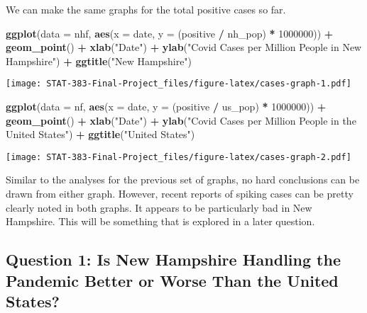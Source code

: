 \documentclass[
]{article}
\newenvironment{Shaded}{\begin{snugshade}}{\end{snugshade}}
\newcommand{\DataTypeTok}[1]{\textcolor[rgb]{0.13,0.29,0.53}{#1}}
\newcommand{\DecValTok}[1]{\textcolor[rgb]{0.00,0.00,0.81}{#1}}
\newcommand{\KeywordTok}[1]{\textcolor[rgb]{0.13,0.29,0.53}{\textbf{#1}}}
\newcommand{\NormalTok}[1]{#1}
\newcommand{\OperatorTok}[1]{\textcolor[rgb]{0.81,0.36,0.00}{\textbf{#1}}}
\newcommand{\StringTok}[1]{\textcolor[rgb]{0.31,0.60,0.02}{#1}}
\begin{document}
We can make the same graphs for the total positive cases so far.

\begin{Shaded}
\begin{Highlighting}[]
\KeywordTok{ggplot}\NormalTok{(}\DataTypeTok{data =}\NormalTok{ nhf, }\KeywordTok{aes}\NormalTok{(}\DataTypeTok{x =}\NormalTok{ date, }\DataTypeTok{y =}\NormalTok{ (positive }\OperatorTok{/}\StringTok{ }\NormalTok{nh_pop) }\OperatorTok{*}\StringTok{ }\DecValTok{1000000}\NormalTok{)) }\OperatorTok{+}\StringTok{ }\KeywordTok{geom_point}\NormalTok{() }\OperatorTok{+}\StringTok{ }\KeywordTok{xlab}\NormalTok{(}\StringTok{"Date"}\NormalTok{) }\OperatorTok{+}\StringTok{ }\KeywordTok{ylab}\NormalTok{(}\StringTok{"Covid Cases per Million People in New Hampshire"}\NormalTok{) }\OperatorTok{+}\StringTok{ }\KeywordTok{ggtitle}\NormalTok{(}\StringTok{"New Hampshire"}\NormalTok{)}
\end{Highlighting}
\end{Shaded}

\texttt{[image: STAT-383-Final-Project\_files/figure-latex/cases-graph-1.pdf]}

\begin{Shaded}
\begin{Highlighting}[]
\KeywordTok{ggplot}\NormalTok{(}\DataTypeTok{data =}\NormalTok{ nf, }\KeywordTok{aes}\NormalTok{(}\DataTypeTok{x =}\NormalTok{ date, }\DataTypeTok{y =}\NormalTok{ (positive }\OperatorTok{/}\StringTok{ }\NormalTok{us_pop) }\OperatorTok{*}\StringTok{ }\DecValTok{1000000}\NormalTok{)) }\OperatorTok{+}\StringTok{ }\KeywordTok{geom_point}\NormalTok{() }\OperatorTok{+}\StringTok{ }\KeywordTok{xlab}\NormalTok{(}\StringTok{"Date"}\NormalTok{) }\OperatorTok{+}\StringTok{ }\KeywordTok{ylab}\NormalTok{(}\StringTok{"Covid Cases per Million People in the United States"}\NormalTok{) }\OperatorTok{+}\StringTok{ }\KeywordTok{ggtitle}\NormalTok{(}\StringTok{"United States"}\NormalTok{)}
\end{Highlighting}
\end{Shaded}

\texttt{[image: STAT-383-Final-Project\_files/figure-latex/cases-graph-2.pdf]}

Similar to the analyses for the previous set of graphs, no hard
conclusions can be drawn from either graph. However, recent reports of
spiking cases can be pretty clearly noted in both graphs. It appears to
be particularly bad in New Hampshire. This will be something that is
explored in a later question.

\hypertarget{question-1-is-new-hampshire-handling-the-pandemic-better-or-worse-than-the-united-states}{%
\subsection{Question 1: Is New Hampshire Handling the Pandemic Better or
Worse Than the United
States?}\label{question-1-is-new-hampshire-handling-the-pandemic-better-or-worse-than-the-united-states}}
\end{document}
